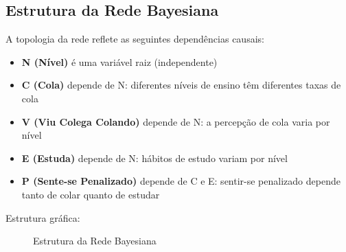 \documentclass[a4paper,12pt]{article}
\begin{document}
\subsection{Estrutura da Rede Bayesiana}

A topologia da rede reflete as seguintes dependências causais:

\begin{itemize}
    \item \textbf{N (Nível)} é uma variável raiz (independente)
    \item \textbf{C (Cola)} depende de N: diferentes níveis de ensino têm diferentes taxas de cola
    \item \textbf{V (Viu Colega Colando)} depende de N: a percepção de cola varia por nível
    \item \textbf{E (Estuda)} depende de N: hábitos de estudo variam por nível
    \item \textbf{P (Sente-se Penalizado)} depende de C e E: sentir-se penalizado depende tanto de colar quanto de estudar
\end{itemize}

Estrutura gráfica:

\begin{figure}[H]
\centering
{}
\caption{Estrutura da Rede Bayesiana}
\label{fig:bayesian-network}
\end{figure}
\end{document}

